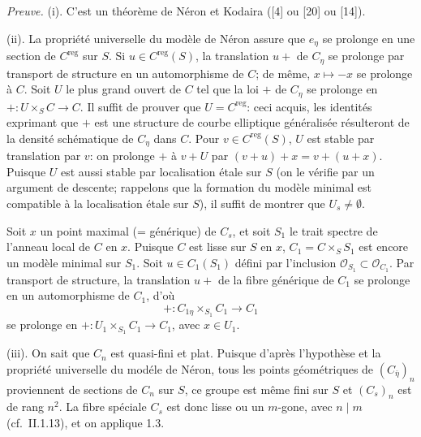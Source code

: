 \documentclass[11pt,a4paper]{amsart}
\theoremstyle{plain}
\theoremstyle{definition}
\DeclareMathOperator{\reg}{reg}
\newcommand{\CO}{\mathcal{O}}
\begin{document}
\noindent\textit{Preuve.} (i). C'est un th\'eor\`eme de N\'eron et Kodaira ([4] ou [20] ou [14]).

(ii). La propri\'et\'e universelle du mod\`ele de N\'eron assure que $e_{\eta}$ se prolonge en une section de $C^{\reg}$ sur $S$. Si $u \in C^{\reg}(S)$, la translation $u+$ de $C_{\eta}$ se prolonge par transport de structure en un automorphisme de $C$; de m\^eme, $x \mapsto -x$ se prolonge \`a $C$. Soit $U$ le plus grand ouvert de $C$ tel que la loi $+$ de $C_{\eta}$ se prolonge en $+ \colon U \times_S C \to C$. Il suffit de prouver que $U = C^{\reg}$: ceci acquis, les identit\'es exprimant que $+$ est une structure de courbe elliptique g\'en\'eralis\'ee r\'esulteront de la densit\'e sch\'ematique de $C_{\eta}$ dans $C$. Pour $v \in C^{\reg}(S)$, $U$ est stable par translation par $v$: on prolonge $+$ \`a $v+U$ par $(v+u)+x = v+(u+x)$. Puisque $U$ est aussi stable par localisation \'etale sur $S$ (on le v\'erifie par un argument de descente; rappelons que la formation du mod\`ele minimal est compatible \`a la localisation \'etale sur $S$), il suffit de montrer que $U_s \neq \emptyset$.

Soit $x$ un point maximal (= g\'en\'erique) de $C_s$, et soit $S_1$ le trait spectre de l'anneau local de $C$ en $x$. Puisque $C$ est lisse sur $S$ en $x$, $C_1 = C \times_S S_1$ est encore un mod\`ele minimal sur $S_1$. Soit $u \in C_1(S_1)$ d\'efini par l'inclusion $\CO_{S_1} \subset \CO_{C_1}$. Par transport de structure, la translation $u+$ de la fibre g\'en\'erique de $C_1$ se prolonge en un automorphisme de $C_1$, d'o\`u
\[
+ \colon C_{1\eta} \times_{S_1} C_1 \longrightarrow C_1
\]
se prolonge en $+ \colon U_1 \times_{S_1} C_1 \to C_1$, avec $x \in U_1$.

(iii). On sait que $C_n$ est quasi-fini et plat. Puisque d'apr\`es l'hypoth\`ese et la propri\'et\'e universelle du mod\'ele de N\'eron, tous les points g\'eom\'etriques de $(C_{\bar{\eta}})_n$ proviennent de sections de $C_n$ sur $S$, ce groupe est m\^eme fini sur $S$ et $(C_s)_n$ est de rang $n^2$. La fibre sp\'eciale $C_s$ est donc lisse ou un $m$-gone, avec $n \mid m$ (cf.~II.1.13), et on applique 1.3.
\end{document}
